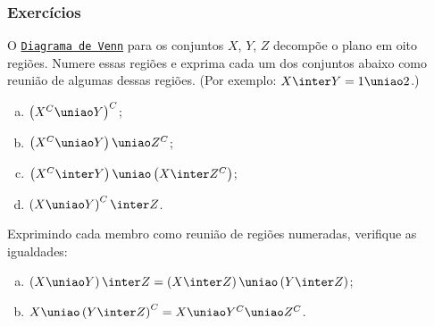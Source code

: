 \begin{frame}
	\frametitle{Exercícios}
	
	\begin{exercicio}
		O \href{https://pt.wikipedia.org/wiki/Diagrama_de_Venn}{{\tt Diagrama de Venn}} para os conjuntos $X$, $Y$, $Z$ decompõe o plano em oito regiões. Numere essas regiões e exprima cada um dos conjuntos abaixo como reunião de algumas dessas regiões.  (Por exemplo: $X \inter Y = 1 \uniao 2$.)
		
		\begin{enumerate}[a.]
			\item $\left(X^C \uniao Y \right)^C$;
			\item $\left(X^C \uniao Y \right) \uniao Z^C$;
			\item $\left(X^C \inter Y \right) \uniao \left(X \inter Z^C \right)$;
			\item $\left(X \uniao Y \right)^C \inter Z$.
		\end{enumerate}
	\end{exercicio}

	\begin{exercicio}
		Exprimindo cada membro como reunião de regiões numeradas, verifique as igualdades:
		\begin{enumerate}[a.]
			\item $\left(X \uniao Y \right)\inter Z = \left(X \inter Z \right) \uniao \left(Y \inter Z
			\right)$;
			\item $X \uniao \left(Y \inter Z \right)^C = X \uniao Y^C \uniao Z^C$.
		\end{enumerate}
	\end{exercicio}
\end{frame}


